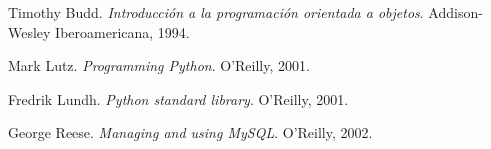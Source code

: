 \documentclass[a4paper, 12pt]{book}
\begin{document}

\begin{thebibliography}{25}


 Timothy Budd. \textit{Introducci\'on a la programaci\'on orientada a objetos}. Addison-Wesley Iberoamericana, 1994.

 Mark Lutz. \textit{Programming Python}. O'Reilly, 2001.

 Fredrik Lundh. \textit{Python standard library}. O'Reilly,
2001.

 George Reese. \textit{Managing and using MySQL}. O'Reilly,
2002.

\end{thebibliography}
\end{document}
